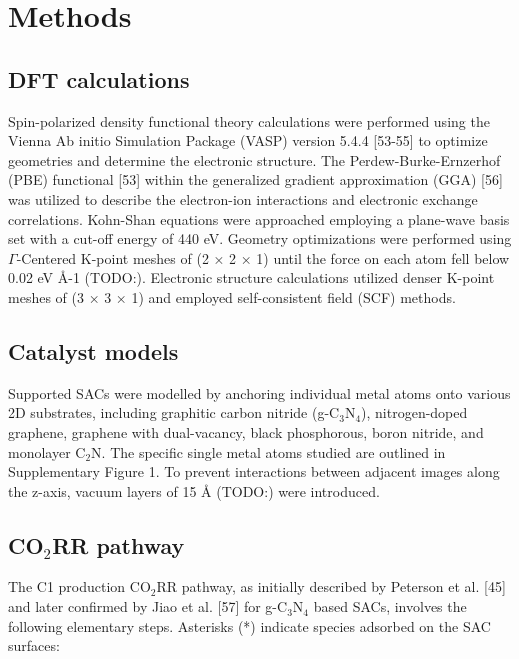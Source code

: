 

\section{Methods}

\subsection{DFT calculations}
Spin-polarized density functional theory calculations were performed using the Vienna Ab initio Simulation Package (VASP) version 5.4.4 [53-55] to optimize geometries and determine the electronic structure.
The Perdew-Burke-Ernzerhof (PBE) functional [53] within the generalized gradient approximation (GGA) [56] was utilized to describe the electron-ion interactions and electronic exchange correlations.
Kohn-Shan equations were approached employing a plane-wave basis set with a cut-off energy of 440 eV.
Geometry optimizations were performed using $\Gamma$-Centered K-point meshes of (2 × 2 × 1) until the force on each atom fell below 0.02 eV Å-1 (TODO:).
Electronic structure calculations utilized denser K-point meshes of (3 × 3 × 1) and employed self-consistent field (SCF) methods.


\subsection{Catalyst models}
Supported SACs were modelled by anchoring individual metal atoms onto various 2D substrates, including graphitic carbon nitride (g-C$_3$N$_4$), nitrogen-doped graphene, graphene with dual-vacancy, black phosphorous, boron nitride, and monolayer C$_2$N.
The specific single metal atoms studied are outlined in Supplementary Figure 1.
To prevent interactions between adjacent images along the z-axis, vacuum layers of 15 Å (TODO:) were introduced.


\subsection{CO$_2$RR pathway}
The C1 production CO$_2$RR pathway, as initially described by Peterson et al. [45] and later confirmed by Jiao et al. [57] for g-C$_3$N$_4$ based SACs, involves the following elementary steps.
Asterisks (*) indicate species adsorbed on the SAC surfaces:


